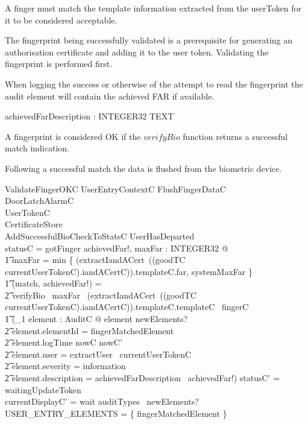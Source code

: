 A finger must match the template information extracted from the
userToken for it to be considered acceptable.

The fingerprint being successfully validated is a prerequisite for
generating an authorisation certificate and adding it to the user token.
Validating the fingerprint is performed first.

When logging the success or otherwise of the attempt to read the
fingerprint the audit element will contain the achieved FAR if available.
\begin{axdef}
        achievedFarDescription : INTEGER32 \fun TEXT
\end{axdef}

A fingerprint is considered OK if the $verifyBio$ function returns a
successful match indication.

Following a successful match the data is flushed from the biometric
device.

\begin{schema}{ValidateFingerOKC}
	UserEntryContextC
\also
        FlushFingerDataC
\\	\Xi DoorLatchAlarmC
\\      \Xi UserTokenC
\\      \Xi CertificateStore
\\      AddSuccessfulBioCheckToStatsC
\where
        \lnot UserHasDeparted
\\	statusC = gotFinger
\also
        \exists achievedFar!, maxFar : INTEGER32 @
\\ \t1     maxFar = min \{  (extractIandACert~((goodTC \inv
                currentUserTokenC).iandACertC)).templateC.far,
        systemMaxFar \}
\\ \t1        \land (match, achievedFar!) = 
\\ \t2                verifyBio~ maxFar~ (extractIandACert~((goodTC \inv
                currentUserTokenC).iandACertC)).templateC.templateC~ fingerC 
\also
\\ \t1  \land (\exists_1 element : AuditC @ element \in newElements? 
\\ \t2  \land element.elementId = fingerMatchedElement
\\ \t2  \land element.logTime \in nowC \upto nowC'
\\ \t2  \land element.user = extractUser~ currentUserTokenC
\\ \t2  \land element.severity = information
\\ \t2  \land element.description = achievedFarDescription~ achievedFar!)
\also
	statusC' = waitingUpdateToken
\\	currentDisplayC' = wait
\also
        auditTypes~ newElements? \cap USER\_ENTRY\_ELEMENTS = 
        \{ fingerMatchedElement \} 
\end{schema}

